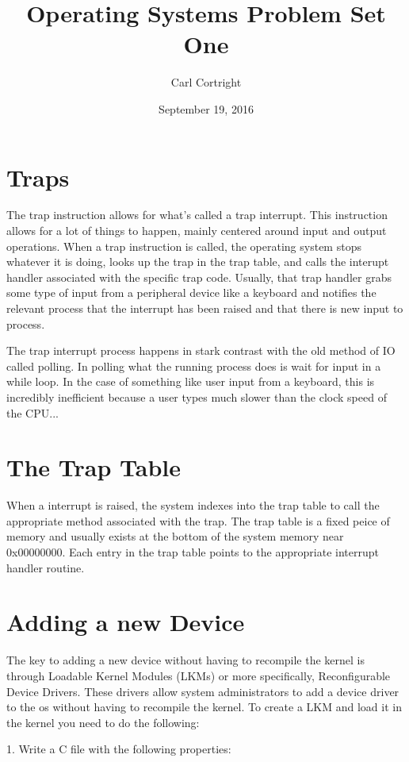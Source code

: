 \documentclass{article}
\title{Operating Systems Problem Set One}
\author{Carl Cortright}
\date{September 19, 2016}
\begin{document}
\maketitle
\section{Traps}

The trap instruction allows for what's called a trap interrupt. This instruction allows for a lot of things to happen, mainly centered around input and output operations. When a trap instruction is called, the operating system stops whatever it is doing, looks up the trap in the trap table, and calls the interupt handler associated with the specific trap code. Usually, that trap handler grabs some type of input from a peripheral device like a keyboard and notifies the relevant process that the interrupt has been raised and that there is new input to process.

The trap interrupt process happens in stark contrast with the old method of IO called polling. In polling what the running process does is wait for input in a while loop. In the case of something like user input from a keyboard, this is incredibly inefficient because a user types much slower than the clock speed of the CPU...

\section{The Trap Table}

When a interrupt is raised, the system indexes into the trap table to call the appropriate method associated with the trap. The trap table is a fixed peice of memory and usually exists at the bottom of the system memory near 0x00000000. Each entry in the trap table points to the appropriate interrupt handler routine.

\section{Adding a new Device}

The key to adding a new device without having to recompile the kernel is through Loadable Kernel Modules (LKMs) or more specifically, Reconfigurable Device Drivers. These drivers allow system administrators to add a device driver to the os without having to recompile the kernel. To create a LKM and load it in the kernel you need to do the following:


1. Write a C file with the following properties:
\end{document}
